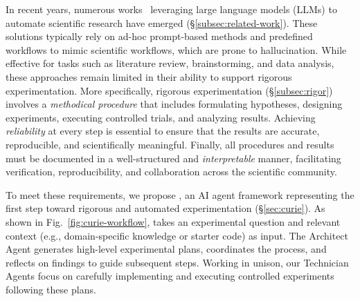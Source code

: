 In recent years, numerous works~\cite{zhang2024comprehensive,auto-science1,lu2024ai} leveraging large language models (LLMs) to automate scientific research have emerged (\S\ref{subsec:related-work}). 
These solutions typically rely on ad-hoc prompt-based methods and predefined workflows to mimic scientific workflows, which are prone to hallucination.
While effective for tasks such as literature review, brainstorming, and data analysis, these approaches remain limited in their ability to support rigorous experimentation.
\fi 
More specifically, rigorous experimentation (\S\ref{subsec:rigor}) involves a \textit{methodical procedure} that includes formulating hypotheses, designing experiments, executing controlled trials, and analyzing results. 
Achieving \textit{reliability} at every step is essential to ensure that the results are accurate, reproducible, and scientifically meaningful. 
Finally, all procedures and results must be documented in a well-structured and \textit{interpretable} manner, facilitating verification, reproducibility, and collaboration across the scientific community.

To meet these requirements, we propose \sys, an AI agent framework representing the first step toward rigorous and automated experimentation (\S\ref{sec:curie}). 
As shown in Fig.~\ref{fig:curie-workflow}, \sys takes an experimental question and relevant context (e.g., domain-specific knowledge or starter code) as input.
The Architect Agent generates high-level experimental plans, coordinates the process, and reflects on findings to guide subsequent steps.
Working in unison, our Technician Agents focus on carefully implementing and executing controlled experiments following these plans.


